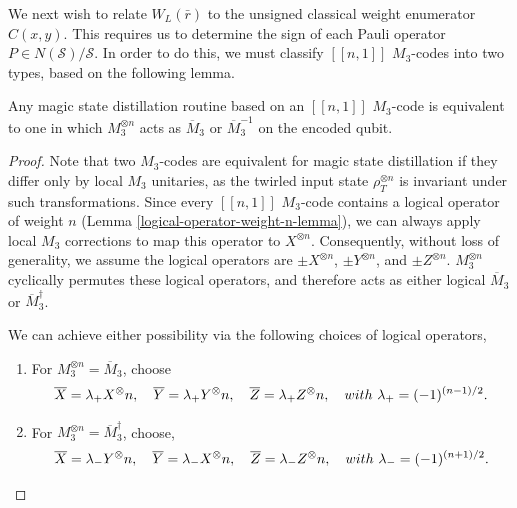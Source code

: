 \documentclass[11pt]{article}
\def\on {\otimes n}
\begin{document}
We next wish to relate $W_L(\bar{r})$ to the unsigned classical weight enumerator $C(x,y)$. This requires us to determine the sign of each Pauli operator $P \in N(\mathcal S)/\mathcal S$. In order to do this, we must classify $[[n,1]]$ $M_3$-codes into two types, based on the following lemma. 
\begin{lemma}
    Any magic state distillation routine based on an $[[n,1]]$ $M_3$-code is equivalent to one in which $M_3^{\otimes n}$ acts as $\overline{M}_3$ or $\overline{M}_3^{-1}$ on the encoded qubit.  \label{lemma:two-classes}
\end{lemma}
\begin{proof}
Note that two $M_3$-codes are equivalent for magic state distillation if they differ only by local $M_3$ unitaries, as the twirled input state $\rho_T^{\otimes n}$ is invariant under such transformations. Since every $[[n,1]]$ $M_3$-code contains a logical operator of weight $n$ (Lemma \ref{logical-operator-weight-n-lemma}), we can always apply local $M_3$ corrections to map this operator to $X^{\otimes n}$. Consequently, without loss of generality, we assume the logical operators are $\pm X^{\otimes n}$, $\pm Y^{\otimes n}$, and $\pm Z^{\otimes n}$. $M_3^{\otimes n}$ cyclically permutes these logical operators, and therefore acts as either logical $\overline{M}_3$ or $\overline{M}_3^\dagger$. 

We can achieve either possibility via the following choices of logical operators,
\begin{enumerate}
    \item For $M_3^{\otimes n} =\overline{M}_3$, choose
    \begin{equation}
        \overline{X}=\lambda_+ X^\on, \quad \overline{Y}=\lambda_+ Y^\on, \quad \overline{Z}=\lambda_+Z^\on, \quad {\rm with }~\lambda_+=(-1)^{(n-1)/2}. \label{eq:type1-phase}
    \end{equation} 
    \item For $M_3^{\otimes n} =\overline{M}_3^\dagger$, choose,
    \begin{equation}
        \overline{X}=\lambda_{-} Y^\on, \quad \overline{Y}=\lambda_{-} X^\on, \quad \overline{Z}=\lambda_-  Z^\on, \quad {\rm with }~\lambda_-=(-1)^{(n+1)/2}.  \label{eq:type5-phase}
    \end{equation}  
\end{enumerate}
\end{proof}
\end{document}

